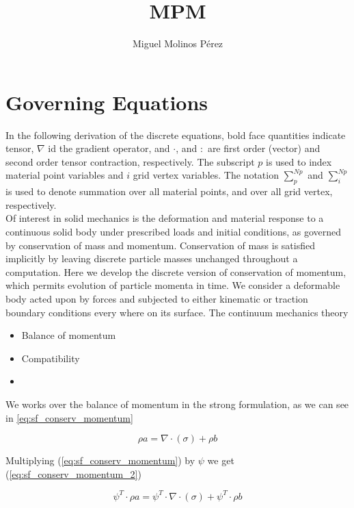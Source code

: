 \message{ !name(../../../mpm.tex)}\documentclass[10pt,a4paper]{article}
\author{Miguel Molinos Pérez}
\title{MPM}
\begin{document}

\section{Governing Equations}
\label{sec:deriv_eq}

In  the following  derivation  of the  discrete  equations, bold  face
quantities  indicate tensor,  $\nabla$ id  the gradient  operator, and
$\cdot$,  and $:$  are first  order (vector)  and second  order tensor
contraction, respectively. The subscript $p$ is used to index material
point  variables   and  $i$   grid  vertex  variables.   The  notation
$\sum_p^{Np}$ and $\sum_i^{Np}$  is used to denote  summation over all
material points, and over all grid vertex, respectively.\\

Of  interest  in  solid  mechanics is  the  deformation  and  material
response to a continuous solid  body under prescribed loads and initial
conditions,    as   governed    by    conservation    of   mass    and
momentum.  Conservation of  mass  is satisfied  implicitly by  leaving
discrete particle  masses unchanged throughout a  computation. Here we
develop  the  discrete  version  of conservation  of  momentum,  which
permits  evolution  of  particle  momenta   in  time.  We  consider  a
deformable body acted upon by forces and subjected to either kinematic
or  traction  boundary conditions  every  where  on its  surface.  The
continuum mechanics theory

\begin{itemize}
\item Balance of momentum
\item Compatibility
\item
\end{itemize}

 
We works over the balance of momentum in the strong formulation, as we
can see in \ref{eq:sf_conserv_momentum}

\begin{equation}
  \label{eq:sf_conserv_momentum}
  \rho a = \nabla \cdot(\sigma) + \rho b  
\end{equation}

Multiplying (\ref{eq:sf_conserv_momentum}) by $\psi$ we get
(\ref{eq:sf_conserv_momentum_2})

\begin{equation}
  \label{eq:sf_conserv_momentum_2}
  \psi^T \cdot \rho a = \psi^T \cdot \nabla\cdot(\sigma) + \psi^T \cdot \rho b
\end{equation}
\end{document}
